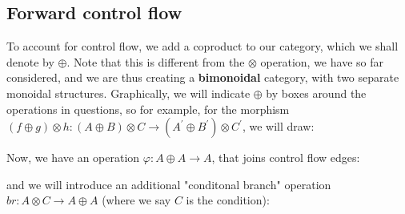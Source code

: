 \documentclass[letterpaper, 10 pt, conference]{ieeeconf}  %
\begin{document}
\subsection{Forward control flow}

To account for control flow, we add a coproduct to our category, which we shall
denote by $\oplus$. Note that this is different from the $\otimes$ operation,
we have so far considered, and we are thus creating a \textbf{bimonoidal}
category, with two separate monoidal structures. Graphically, we will
indicate $\oplus$ by boxes around the operations in questions, so for example,
for the morphism $(f \oplus g) \otimes h: (A \oplus B) \otimes C \to (A^\prime \oplus B^\prime) \otimes C^\prime$,
we will draw:

\begin{center}
\end{center}

Now, we have an operation $\varphi: A \oplus A \to A$, that joins control flow edges:

\begin{center}
\end{center}

and we will introduce an additional "conditonal branch" operation $br: A \otimes C \to A \oplus A$ (where we say $C$
is the condition):
\end{document}
